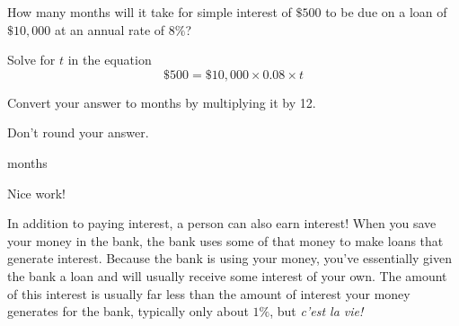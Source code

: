 \documentclass{ximera}
\begin{document}
\begin{question}
How many months will it take for simple interest of $\$500$ to be due on a loan of $\$10,000$ at an annual rate of $8\%$? 	

\begin{solution}
\begin{hint}
Solve for $t$ in the equation
\begin{equation*}\$500=\$10,000\times 0.08\times t\end{equation*}
\end{hint}
\begin{hint}
Convert your answer to months by multiplying it by 12.
\end{hint}
\begin{hint}
Don't round your answer.
\end{hint}
 months

\begin{comment}
\begin{expression-answer}
function validator(p) {
    if (p == 7.5)
      return 1;
    if (p == 7) {feedback( `Don't round your answer.')
    }
    if (p == 8) {feedback( `Don't round your answer.')
    }
      return 0;
  }
\end{expression-answer}
\end{comment}
\end{solution}	

Nice work!
\end{question}

In addition to paying interest, a person can also earn interest! When you save your money in the bank, the bank uses some of that money to make loans that generate interest. Because the bank is using your money, you've essentially given the bank a loan and will usually receive some interest of your own. The amount of this interest is usually far less than the amount of interest your money generates for the bank, typically only about $1\%$, but \emph{c'est la vie!}
\end{document}
